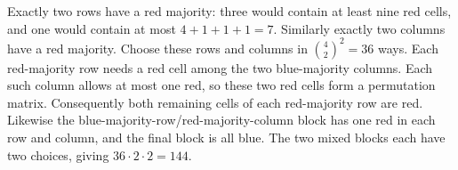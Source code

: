 Exactly two rows have a red majority: three would contain at least nine red cells, and one would contain at most $4+1+1+1=7$. Similarly exactly two columns have a red majority. Choose these rows and columns in $\binom42^2=36$ ways. Each red-majority row needs a red cell among the two blue-majority columns. Each such column allows at most one red, so these two red cells form a permutation matrix. Consequently both remaining cells of each red-majority row are red. Likewise the blue-majority-row/red-majority-column block has one red in each row and column, and the final block is all blue. The two mixed blocks each have two choices, giving $36\cdot2\cdot2=\boxed{144}$.
